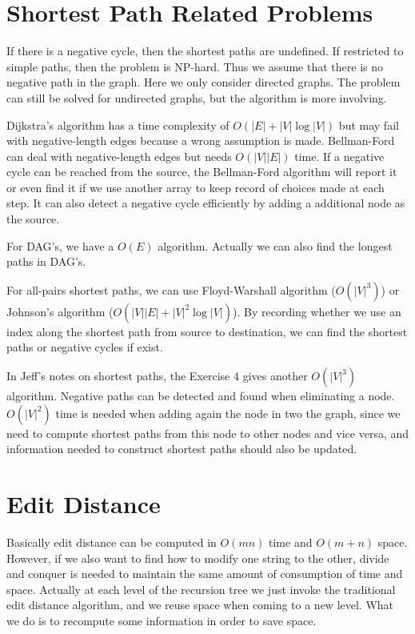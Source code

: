 \documentclass[openany]{book}
\begin{document}
\section{Shortest Path Related Problems}
If there is a negative cycle, then the shortest paths are undefined. If restricted to simple paths, then the problem is NP-hard. Thus we assume that there is no negative path in the graph. Here we only consider directed graphs. The problem can still be solved for undirected graphs, but the algorithm is more involving.

Dijkstra's algorithm has a time complexity of $O(|E|+|V|\log|V|)$ but may fail with negative-length edges because a wrong assumption is made. Bellman-Ford can deal with negative-length edges but needs $O(|V||E|)$ time. If a negative cycle can be reached from the source, the Bellman-Ford algorithm will report it or even find it if we use another array to keep record of choices made at each step. It can also detect a negative cycle efficiently by adding a additional node as the source.

For DAG's, we have a $O(E)$ algorithm. Actually we can also find the longest paths in DAG's.

For all-pairs shortest paths, we can use Floyd-Warshall algorithm ($O(|V|^3)$) or Johnson's algorithm ($O(|V||E|+|V|^2\log|V|)$). By recording whether we use an index along the shortest path from source to destination, we can find the shortest paths or negative cycles if exist.

In Jeff's notes on shortest paths, the Exercise 4 gives another $O(|V|^3)$ algorithm. Negative paths can be detected and found when eliminating a node. $O(|V|^2)$ time is needed when adding again the node in two the graph, since we need to compute shortest paths from this node to other nodes and vice versa, and information needed to construct shortest paths should also be updated.

\section{Edit Distance}
Basically edit distance can be computed in $O(mn)$ time and $O(m+n)$ space. However, if we also want to find how to modify one string to the other, divide and conquer is needed to maintain the same amount of consumption of time and space. Actually at each level of the recursion tree we just invoke the traditional edit distance algorithm, and we reuse space when coming to a new level. What we do is to recompute some information in order to save space.
\end{document}
